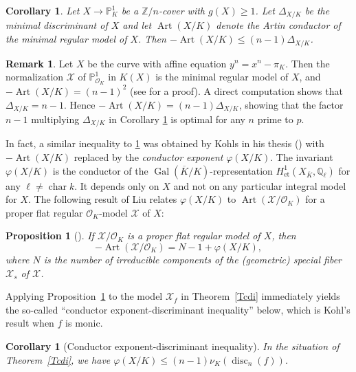 \documentclass[12pt]{amsart}
\numberwithin{equation}{section}
\newtheorem{corollary}[equation]{Corollary}
\newtheorem{prop}[equation]{Proposition}
\theoremstyle{definition}
\newtheorem{remark}[equation]{Remark}
\newcommand{\mc}[1]{\mathcal{#1}}
\newcommand{\Q}{\mathbb Q}
\newcommand{\ints}{\mathbb Z}
\renewcommand{\O}{\mathcal{O}}
\renewcommand{\P}{\mathbb P}
\newcommand{\proj}{\mathbb P}
\renewcommand{\phi}{\varphi}
\newcommand{\X}{\mathcal{X}}
\DeclareMathOperator{\Gal}{Gal}
\DeclareMathOperator{\disc}{disc}
\DeclareMathOperator{\cha}{char}
\DeclareMathOperator{\Art}{Art}
\begin{document}
\begin{corollary}\label{Tfinalthm}
Let $X \to \proj^1_K$ be a $\ints/n$-cover with $g(X) \geq 1$.
 Let $\Delta_{X/K}$ be the minimal discriminant of $X$
 and let $\Art(X/K)$ denote the Artin conductor of the minimal regular
 model of $X$. Then
 $-\Art(X/K) \leq (n-1) \Delta_{X/K}$.
\end{corollary}

\begin{remark} Let $X$ be the curve with affine equation $y^n=x^n-\pi_K$. Then the normalization $\X$ of $\P^1_{\O_K}$ in $K(X)$ is the minimal regular model of $X$, and $-\Art(X/K) = (n-1)^2$ (see  for a proof). A direct computation shows that $\Delta_{X/K} = n-1 $. Hence $-\Art(X/K) = (n-1) \Delta_{X/K}$, showing that the factor $n-1$ multiplying $\Delta_{X/K}$ in Corollary \ref{Tfinalthm} is optimal for any $n$ prime to $p$.  
    
    
   
   
\end{remark}

In fact, a similar inequality to \ref{Tfinalthm} was obtained by Kohls in his thesis (\cite[Theorem 5.1.11]{Kohls}) with
$-\Art(X/K)$ replaced by the \emph{conductor exponent} $\phi(X/K)$. The invariant $\phi(X/K)$
is the conductor of the 
$\Gal(\overline{K}/K)$-representation $H^1_{\mathrm{et}}(X_{\overline{K}}, \Q_\ell)$  for any $\ell \neq \cha k$. It depends only on $X$ and not on any particular integral model for $X$.
The following result of Liu relates $\phi(X/K)$ to $\Art(\mc{X}/\mc{O}_K)$ for a proper flat regular $\mc{O}_K$-model
$\mc{X}$ of $X$:

\begin{prop}[{\cite[Proposition~1]{Li:cd}}]\label{Partinconductor}
  If $\mc{X}/\mc{O}_K$ is a proper flat regular model of $X$, then
  $$-\Art(\mc{X}/\mc{O}_K) = N - 1 + \phi(X/K),$$
where $N$ is the number of irreducible components of the (geometric)
special fiber $\mc{X}_{s}$ of $\mc{X}$.
\end{prop}

Applying Proposition~\ref{Partinconductor} to the model $\mc{X}_f$ in Theorem~\ref{Tcdi} 
immediately yields the so-called ``conductor exponent-discriminant
inequality'' below, which is Kohl's result when $f$ is monic. 

\begin{corollary}[Conductor exponent-discriminant inequality]\label{Ccedi}
In the situation of Theorem~\ref{Tcdi}, we have $\phi(X/K) \leq (n-1)\nu_K(\disc_n(f))$.
\end{corollary}
\end{document}
